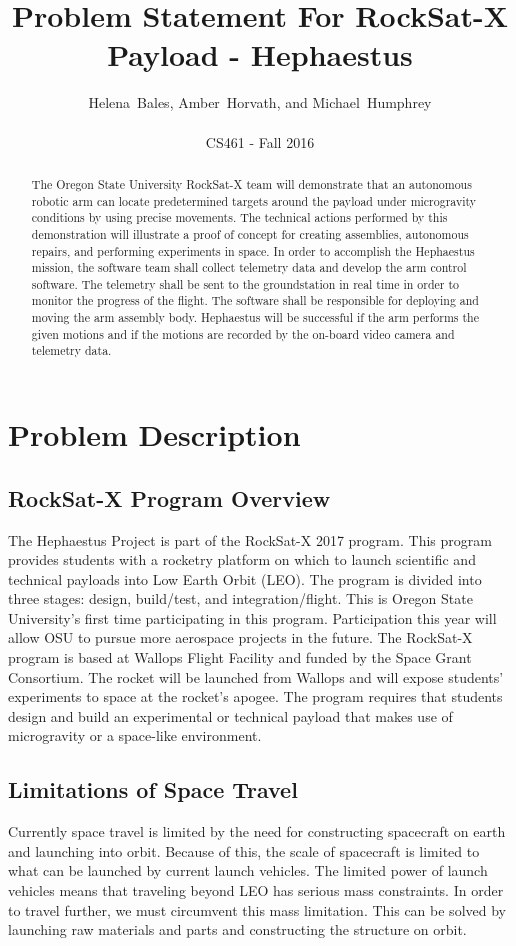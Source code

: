 \documentclass[letterpaper,10pt]{article}
\title{Problem Statement For RockSat-X Payload - Hephaestus}
\author{Helena~Bales, Amber~Horvath, and Michael~Humphrey\\ \\ CS461 - Fall 2016}
\begin{document}
\maketitle

\begin{abstract}
The Oregon State University RockSat-X team will demonstrate that an autonomous robotic arm can
locate predetermined targets around the payload under microgravity conditions by using precise
movements. The technical actions performed by this demonstration will illustrate a proof of concept
for creating assemblies, autonomous repairs, and performing experiments in space. In order to
accomplish the Hephaestus mission, the software team shall collect telemetry data and develop the arm
control software. The telemetry shall be sent to the groundstation in real time in order to monitor 
the progress of the flight. The software shall be responsible for deploying and moving the arm 
assembly body. Hephaestus will be successful if the arm performs the given motions and if the motions
 are recorded by the on-board video camera and telemetry data.
\end{abstract}

\clearpage

\section{Problem Description}
\subsection{RockSat-X Program Overview}
The Hephaestus Project is part of the RockSat-X 2017 program. This program provides students with a 
rocketry platform on which to launch scientific and technical payloads into Low Earth Orbit (LEO). 
The program is divided into three stages: design, build/test, and integration/flight. This is Oregon 
 State University's first time participating in this program. Participation this year will allow OSU
   to pursue more aerospace projects in the future. The RockSat-X program is based at Wallops Flight 
Facility and funded by the Space Grant Consortium. The rocket will be launched from Wallops and will
 expose students' experiments to space at the rocket's apogee. The program requires that students 
design and build an experimental or technical payload that makes use of microgravity or a space-like
environment.

\subsection{Limitations of Space Travel}
Currently space travel is limited by the need for constructing spacecraft on earth and launching into
orbit. Because of this, the scale of spacecraft is limited to what can be launched by current launch
 vehicles. The limited power of launch vehicles means that traveling beyond LEO has serious mass 
constraints. In order to travel further, we must circumvent this mass limitation. This can be 
solved by launching raw materials and parts and constructing the structure on orbit. 
\end{document}
